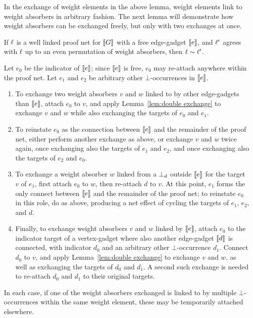 \documentclass[conference]{IEEEtran}
\begin{document}
In the exchange of weight elements in the above lemma, weight elements link to weight absorbers in arbitrary fashion.
%
The next lemma will demonstrate how weight absorbers can be exchanged freely, but only with two exchanges at once. 



\begin{lemma}
\label{lem:permute weight absorbers}
If $\ell$ is a well linked proof net for $\llbracket G\rrbracket$ with a free edge-gadget $\llbracket e\rrbracket$, and $\ell'$ agrees with $\ell$ up to an even permutation of weight absorbers, then $\links\perm\links'$.
\end{lemma}

\begin{IEEEproof}
Let $e_0$ be the indicator of $\llbracket e\rrbracket$; since $\llbracket e\rrbracket$ is free, $e_0$ may re-attach anywhere within the proof net.
%
Let $e_1$ and $e_2$ be arbitrary other $\bot$-occurrences in $\llbracket e\rrbracket$.

\begin{enumerate}

	\item
To exchange two weight absorbers $v$ and $w$ linked to by other edge-gadgets than $\llbracket e\rrbracket$, attach $e_0$ to $v$, and apply Lemma~\ref{lem:double exchange} to exchange $v$ and $w$ while also exchanging the targets of $e_0$ and $e_1$.

	\item
To reinstate $e_0$ as the connection between $\llbracket e\rrbracket$ and the remainder of the proof net, either perform another exchange as above, or exchange $v$ and $w$ twice again, once exchanging also the targets of $e_1$ and $e_2$, and once exchanging also the targets of $e_2$ and $e_0$.

	\item
To exchange a weight absorber $w$ linked from a $\bot_{d}$ outside $\llbracket e\rrbracket$ for the target $v$ of $e_1$, first attach $e_0$ to $w$, then re-attach $d$ to $v$.
%
At this point, $e_1$ forms the only connect between $\llbracket e\rrbracket$ and the remainder of the proof net; to reinstate $e_0$ in this role, do as above, producing a net effect of cycling the targets of $e_1$, $e_2$, and $d$.

	\item
Finally, to exchange weight absorbers $v$ and $w$ linked by $\llbracket e\rrbracket$, attach $e_0$ to the indicator target of a vertex-gadget where also another edge-gadget $\llbracket d\rrbracket$ is connected, with indicator $d_0$ and an arbitrary other $\bot$-occurrence $d_1$.
%
Connect $d_0$ to $v$, and apply Lemma~\ref{lem:double exchange} to exchange $v$ and $w$, as well as exchanging the targets of $d_0$ and $d_1$.
%
A second such exchange is needed to re-attach $d_0$ and $d_1$ to their original targets.

\end{enumerate}

In each case, if one of the weight absorbers exchanged is linked to by multiple $\bot$-occurrences within the same weight element, these may be temporarily attached elsewhere.
%
\end{IEEEproof}
\end{document}

